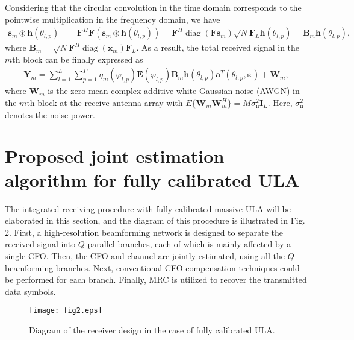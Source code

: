 \documentclass[12pt, draftclsnofoot, onecolumn]{IEEEtran}
\begin{document}
Considering that the circular convolution in the time domain corresponds to the pointwise multiplication in the frequency domain, we have
\begin{align}
\mathbf{s}_m \circledast \mathbf{h}(\theta_{l,p}) &= \mathbf{F}^H \mathbf{F} \left(\mathbf{s}_m \circledast \mathbf{h}(\theta_{l,p})\right) = \mathbf{F}^H  \operatorname{diag}(\mathbf{F} \mathbf{s}_m) \sqrt{N} \mathbf{F}_L \mathbf{h}(\theta_{l,p}) = {{\mathbf{B}}_{m}}\mathbf{h}\left( {{\theta }_{l,p}} \right),
\end{align}
where ${{\mathbf{B}}_{m}} \!=\! \sqrt{N}{{\mathbf{F}}^{H}} \operatorname{diag} \left( {{\mathbf{x}}_{m}} \right) {{\mathbf{F}}_{L}}$.
As a result, the total received signal in the $m$th block can be finally expressed as
\begin{align} \label{ReceivedSignal}
{{\mathbf{Y}}_{m}} = \sum\limits_{l=1}^{L}{\sum\limits_{p=1}^{P}{{{\eta }_{m}}\left( {{\varphi }_{l,p}} \right)\mathbf{E}\left( {{\varphi }_{l,p}} \right){{\mathbf{B}}_{m}}\mathbf{h}\left( {{\theta }_{l,p}} \right){{\mathbf{a}}^{T}}\left( {{\theta }_{l, p}}, \boldsymbol{\varepsilon } \right)}} + {{\mathbf{W}}_{m}},
\end{align}
where ${{\mathbf{W}}_{m}}$ is the zero-mean complex additive white Gaussian noise (AWGN) in the $m$th block at the receive antenna array with $E\{{{\mathbf{W}}_{m}}{{\mathbf{W}}_{m}^H}\} \!=\! M{\sigma_{\mathrm{n}}^{2}}{\mathbf{I}_L}$. Here, $\sigma_{\mathrm{n}}^{2}$ denotes the noise power.


\vspace{-0.6em}
\section{Proposed joint estimation algorithm for fully calibrated ULA}
The integrated receiving procedure with fully calibrated massive ULA will be elaborated in this section, and the diagram of this procedure is illustrated in Fig. 2. First, a high-resolution beamforming network is designed to separate the received signal into $Q$ parallel branches, each of which is mainly affected by a single CFO. Then, the CFO and channel are jointly estimated, using all the $Q$ beamforming branches. Next, conventional CFO compensation techniques could be performed for each branch. Finally, MRC is utilized to recover the transmitted data symbols.

\begin{figure}[t]
\setlength{\abovecaptionskip}{-0.5cm}
\setlength{\belowcaptionskip}{-1cm}
\begin{center}
\texttt{[image: fig2.eps]}
\end{center}
\caption{ Diagram of the receiver design in the case of fully calibrated ULA.}
\end{figure}
\end{document}
